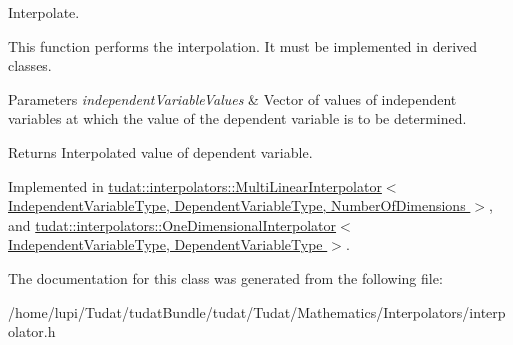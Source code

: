 Interpolate. 

This function performs the interpolation. It must be implemented in derived classes. 
\begin{DoxyParams}{Parameters}
{\em independent\+Variable\+Values} & Vector of values of independent variables at which the value of the dependent variable is to be determined. \\
\hline
\end{DoxyParams}
\begin{DoxyReturn}{Returns}
Interpolated value of dependent variable. 
\end{DoxyReturn}


Implemented in \hyperlink{classtudat_1_1interpolators_1_1MultiLinearInterpolator_ac41f7ee6508212d5827fb461c850a75f}{tudat\+::interpolators\+::\+Multi\+Linear\+Interpolator$<$ Independent\+Variable\+Type, Dependent\+Variable\+Type, Number\+Of\+Dimensions $>$}, and \hyperlink{classtudat_1_1interpolators_1_1OneDimensionalInterpolator_aaf340e39d13f8b31cab6887b48427918}{tudat\+::interpolators\+::\+One\+Dimensional\+Interpolator$<$ Independent\+Variable\+Type, Dependent\+Variable\+Type $>$}.



The documentation for this class was generated from the following file\+:\begin{DoxyCompactItemize}
\item 
/home/lupi/\+Tudat/tudat\+Bundle/tudat/\+Tudat/\+Mathematics/\+Interpolators/interpolator.\+h\end{DoxyCompactItemize}
